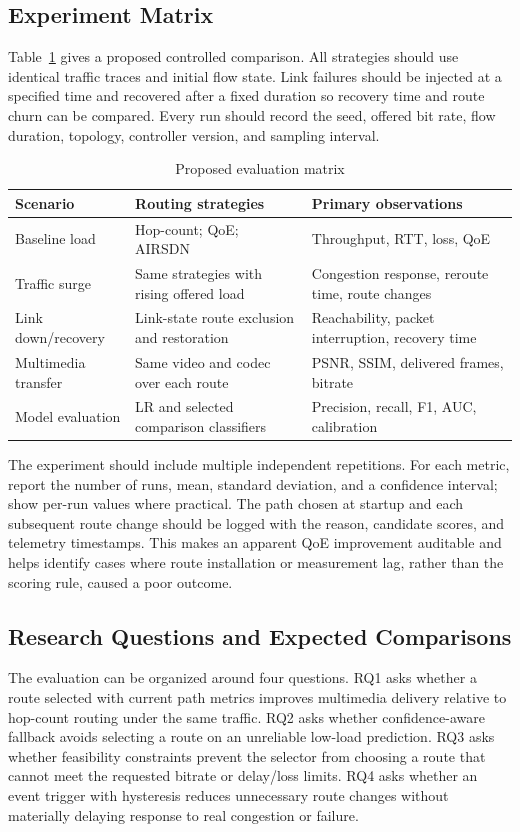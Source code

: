 \documentclass[conference]{IEEEtran}
\begin{document}
\subsection{Experiment Matrix}
Table~\ref{tab:experiment} gives a proposed controlled comparison. All strategies should use identical traffic traces and initial flow state. Link failures should be injected at a specified time and recovered after a fixed duration so recovery time and route churn can be compared. Every run should record the seed, offered bit rate, flow duration, topology, controller version, and sampling interval.
\begin{table}[t]
\centering
\caption{Proposed evaluation matrix}
\label{tab:experiment}
\begin{tabular}{@{}p{}p{}p{}@{}}
\toprule
Scenario & Routing strategies & Primary observations \\
\midrule
Baseline load & Hop-count; QoE; AIRSDN & Throughput, RTT, loss, QoE \\
Traffic surge & Same strategies with rising offered load & Congestion response, reroute time, route changes \\
Link down/recovery & Link-state route exclusion and restoration & Reachability, packet interruption, recovery time \\
Multimedia transfer & Same video and codec over each route & PSNR, SSIM, delivered frames, bitrate \\
Model evaluation & LR and selected comparison classifiers & Precision, recall, F1, AUC, calibration \\
\bottomrule
\end{tabular}
\end{table}

The experiment should include multiple independent repetitions. For each metric, report the number of runs, mean, standard deviation, and a confidence interval; show per-run values where practical. The path chosen at startup and each subsequent route change should be logged with the reason, candidate scores, and telemetry timestamps. This makes an apparent QoE improvement auditable and helps identify cases where route installation or measurement lag, rather than the scoring rule, caused a poor outcome.

\subsection{Research Questions and Expected Comparisons}
The evaluation can be organized around four questions. RQ1 asks whether a route selected with current path metrics improves multimedia delivery relative to hop-count routing under the same traffic. RQ2 asks whether confidence-aware fallback avoids selecting a route on an unreliable low-load prediction. RQ3 asks whether feasibility constraints prevent the selector from choosing a route that cannot meet the requested bitrate or delay/loss limits. RQ4 asks whether an event trigger with hysteresis reduces unnecessary route changes without materially delaying response to real congestion or failure.
\end{document}
